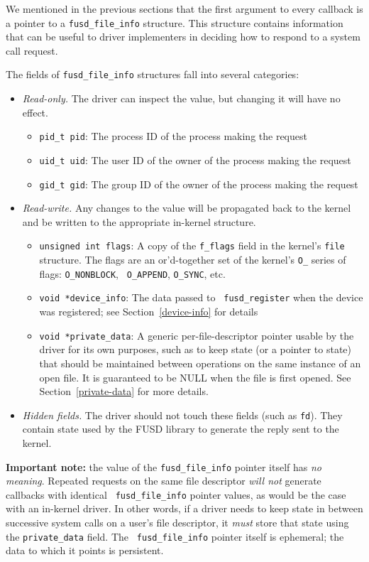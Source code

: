 \documentclass{article}
\begin{document}
\label{fusd-file-info}

We mentioned in the previous sections that the first argument to every
callback is a pointer to a {\tt fusd\_file\_info} structure.  This
structure contains information that can be useful to driver
implementers in deciding how to respond to a system call request.

The fields of {\tt fusd\_file\_info} structures fall into several
categories:
\begin{itemize}
\item {\em Read-only.}  The driver can inspect the value, but changing
it will have no effect.
\begin{itemize}
\item {\tt pid\_t pid}: The process ID of the process making the
request
\item {\tt uid\_t uid}: The user ID of the owner of the process making
the request
\item {\tt gid\_t gid}: The group ID of the owner of the process making
the request
\end{itemize}
\item {\em Read-write.}  Any changes to the value will be propagated
back to the kernel and be written to the appropriate in-kernel
structure.
\begin{itemize}
\item {\tt unsigned int flags}: A copy of the {\tt f\_flags} field in
the kernel's {\tt file} structure.  The flags are an or'd-together set
of the kernel's {\tt O\_} series of flags: {\tt O\_NONBLOCK}, {\tt
O\_APPEND}, {\tt O\_SYNC}, etc.
\item {\tt void *device\_info}: The data passed to {\tt
fusd\_register} when the device was registered; see
Section~\ref{device-info} for details
\item {\tt void *private\_data}: A generic per-file-descriptor pointer
usable by the driver for its own purposes, such as to keep state (or a
pointer to state) that should be maintained between operations on the
same instance of an open file.  It is guaranteed to be NULL when the
file is first opened.  See Section~\ref{private-data} for more
details.
\end{itemize}
\item {\em Hidden fields.}  The driver should not touch these fields
(such as {\tt fd}).  They contain state used by the FUSD library to
generate the reply sent to the kernel.
\end{itemize}

{\bf Important note:} the value of the {\tt fusd\_file\_info} pointer
itself has {\em no meaning}.  Repeated requests on the same file
descriptor {\em will not} generate callbacks with identical {\tt
fusd\_file\_info} pointer values, as would be the case with an
in-kernel driver.  In other words, if a driver needs to keep state in
between successive system calls on a user's file descriptor, it {\em
must} store that state using the {\tt private\_data} field.  The {\tt
fusd\_file\_info} pointer itself is ephemeral; the data to which it
points is persistent.
\end{document}
